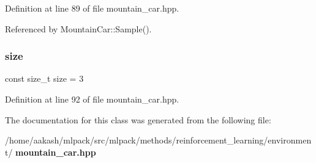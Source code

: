 Definition at line 89 of file mountain\+\_\+car.\+hpp.



Referenced by Mountain\+Car\+::\+Sample().

\mbox{\label{classmlpack_1_1rl_1_1MountainCar_1_1Action_a685609860d73ccd0d45ada287ab9ab5f}} 
\subsubsection{size}
{\footnotesize\ttfamily const size\+\_\+t size = 3\hspace{0.3cm}{\ttfamily [static]}}



Definition at line 92 of file mountain\+\_\+car.\+hpp.



The documentation for this class was generated from the following file\+:\begin{DoxyCompactItemize}
\item 
/home/aakash/mlpack/src/mlpack/methods/reinforcement\+\_\+learning/environment/\textbf{ mountain\+\_\+car.\+hpp}\end{DoxyCompactItemize}
